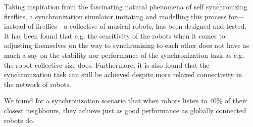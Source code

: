 Taking inspiration from the fascinating natural phenomena of self synchronizing fireflies, a synchronization simulator imitating and modelling this process for—instead of fireflies—a collective of musical robots, has been designed and tested. It has been found that e.g. the sensitivity of the robots when it comes to adjusting themselves on the way to synchronizing to each other does not have as much a say on the stability nor performance of the synchronization task as e.g. the robot collective size does. Furthermore, it is also found that the synchronization task can still be achieved despite more relaxed connectivity in the network of robots.

We found for a synchronization scenario that when robots listen to 40\% of their closest neighbours, they achieve just as good performance as globally connected robots do.